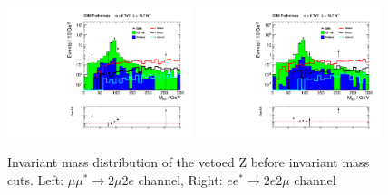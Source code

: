 \begin{figure}[hp!]
\begin{center}
\includegraphics[width=0.48\textwidth]{plot/nonZ_2mu2e.pdf} 
\includegraphics[width=0.48\textwidth]{plot/nonZ_2e2mu.pdf}
\end{center}
\caption{\label{fig:MinvnoZ}Invariant mass distribution of the vetoed Z before invariant mass cuts. Left: $\mu\mu^{*}\rightarrow 2\mu2e$ channel, Right: $ee^{*}\rightarrow 2e2\mu$ channel}
\end{figure}


